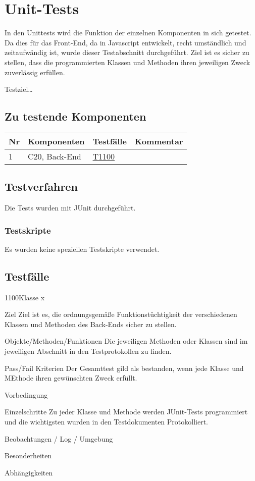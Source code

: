 
\chapter{Unit-Tests}
In den Unittests wird die Funktion der einzelnen Komponenten in sich getestet. Da dies für das Front-End, da in Javascript entwickelt, recht umständlich und zeitaufwändig ist, wurde dieser Testabschnitt durchgeführt. 
Ziel ist es sicher zu stellen, dass die programmierten Klassen und Methoden ihren jeweiligen Zweck zuverlässig erfüllen.

Testziel\ldots

\section{Zu testende Komponenten}

\begin{center}
	\begin{longtable}{|m{}|m{}|m{}|m{}|}
		\hline
		\textbf{Nr} & \textbf{Komponenten} & \textbf{Testfälle} & \textbf{Kommentar}\\ 
		\hline
		1  & C20, Back-End  & \hyperref[T1100]{T1100}   &     \\ 
		\hline
	\end{longtable}
\end{center}


\section{Testverfahren}
Die Tests wurden mit JUnit durchgeführt.

\subsection{Testskripte}
Es wurden keine speziellen Testskripte verwendet.

\section{Testfälle}

\begin{testcase}{1100}{Klasse x}
\label{T1100}
\item[Ziel]
Ziel ist es, die ordnungsgemäße Funktionstüchtigkeit der verschiedenen Klassen und Methoden des Back-Ends sicher zu stellen.
\item[Objekte/Methoden/Funktionen]
Die jeweiligen Methoden oder Klassen sind im jeweiligen Abschnitt in den Testprotokollen zu finden.
\item[Pass/Fail Kriterien]
Der Gesamttest gild als bestanden, wenn jede Klasse und MEthode ihren gewünschten Zweck erfüllt.
\item[Vorbedingung]
\item[Einzelschritte]
Zu jeder Klasse und Methode werden JUnit-Tests programmiert und die wichtigsten wurden in den Testdokumenten Protokolliert.
\item[Beobachtungen / Log / Umgebung]
\item[Besonderheiten]
\item[Abhängigkeiten]
\end{testcase}

